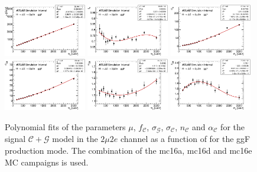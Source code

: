 \begin{figure}[htbp]
    \centering
    \includegraphics[width=0.32\textwidth]{figures/HMHZZ/signal/ggf_graph_mass_mean_2mu2e_fit.eps}
    \includegraphics[width=0.32\textwidth]{figures/HMHZZ/signal/ggf_graph_f_cb_gauss_2mu2e_fit.eps}
    \includegraphics[width=0.32\textwidth]{figures/HMHZZ/signal/ggf_graph_mass_gauss_sigma_2mu2e_fit.eps} \\
    \includegraphics[width=0.32\textwidth]{figures/HMHZZ/signal/ggf_graph_mass_cb_sigma_2mu2e_fit.eps}
    \includegraphics[width=0.32\textwidth]{figures/HMHZZ/signal/ggf_graph_mass_cb_alpha_2mu2e_fit.eps}
    \includegraphics[width=0.32\textwidth]{figures/HMHZZ/signal/ggf_graph_mass_cb_n_2mu2e_fit.eps}
    \caption{Polynomial fits of the parameters $\mu$, $f_{\mathcal{C}}$, $\sigma_{\mathcal{G}}$, $\sigma_{\mathcal{C}}$,
    $n_{\mathcal{C}}$ and $\alpha_{\mathcal{C}}$ for the signal $\mathcal{C}+\mathcal{G}$ model in the $2\mu 2e$ channel as a function of \mH for
    the ggF production mode. The combination of the mc16a, mc16d and mc16e MC campaigns is used.}
    \label{fig:ggf_fitParams_interpolation_2mu2e}
\end{figure}

